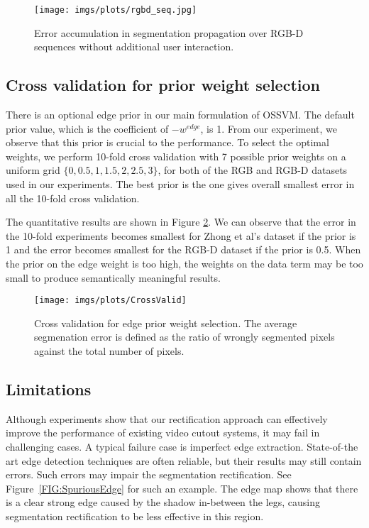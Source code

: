 \documentclass[10pt,journal,compsoc]{newIEEEtran}
\begin{document}
\begin{figure}[!t]
\centering
\texttt{[image: imgs/plots/rgbd\_seq.jpg]}
\caption{Error accumulation in segmentation propagation over RGB-D sequences without additional user interaction. }\label{FIG:Rst_SeqPropagRGBD}\vspace{-0.5cm}
\end{figure}\subsection{Cross validation for prior weight selection}
There is an optional edge prior in our main formulation of OSSVM. The default prior value, which is the coefficient of $-w^{edge}$, is 1. From our experiment, we observe that this prior is crucial to the performance. To select the optimal weights, we perform 10-fold cross validation with 7 possible prior weights on a uniform grid $\{0,0.5,1,1.5,2,2.5,3\}$, for both of the RGB and RGB-D datasets used in our experiments. The best prior is the one gives overall smallest error in all the 10-fold cross validation.

The quantitative results are shown in Figure \ref{FIG:CrossValid}. We can observe that the error in the 10-fold experiments becomes smallest for Zhong et al's dataset if the prior is 1 and the error becomes smallest for the RGB-D dataset if the prior is 0.5. When the prior on the edge weight is too high, the weights on the data term may be too small to produce semantically meaningful results.
\begin{figure}[!t]
 	\centering
 	\texttt{[image: imgs/plots/CrossValid]}
 	\caption{Cross validation for edge prior weight selection. The average segmenation error is defined as the ratio of wrongly segmented pixels against the total number of pixels.}\label{FIG:CrossValid}
 \end{figure}\subsection{Limitations}\label{sec:discussion}
Although experiments show that our rectification approach can effectively improve the performance of existing video cutout systems, it may fail in challenging cases. A typical failure case is imperfect edge extraction. State-of-the art edge detection techniques are often reliable, but their results may still contain errors. Such errors may impair the segmentation rectification. See Figure~\ref{FIG:SpuriousEdge} for such an example. The edge map shows that there is a clear strong edge caused by the shadow in-between the legs, causing segmentation rectification to be less effective in this region. %
\end{document}
